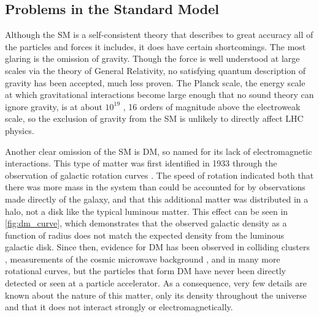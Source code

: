 \subsection{Problems in the Standard Model}
\label{sec:sm_problems}

Although the \ac{SM} is a self-consistent theory that describes to great accuracy all of the particles and forces it includes, it does have certain shortcomings. The most glaring is the omission of gravity. Though the force is well understood at large scales via the theory of General Relativity, no satisfying quantum description of gravity has been accepted, much less proven. The Planck scale, the energy scale at which gravitational interactions become large enough that no sound theory can ignore gravity, is at about $10^{19}$ \GeV, 16 orders of magnitude above the electroweak scale, so the exclusion of gravity from the \ac{SM} is unlikely to directly affect \ac{LHC} physics. 

Another clear omission of the \ac{SM} is \acf{DM}, so named for its lack of electromagnetic interactions. This type of matter was first identified in 1933 through the observation of galactic rotation curves \cite{zwicky}. The speed of rotation indicated both that there was more mass in the system than could be accounted for by observations made directly of the galaxy, and that this additional matter was distributed in a halo, not a disk like the typical luminous matter. This effect can be seen in \autoref{fig:dm_curve}, which demonstrates that the observed galactic density as a function of radius does not match the expected density from the luminous galactic disk. Since then, evidence for \ac{DM} has been observed in colliding clusters \cite{astro-ph/0608407}, measurements of the cosmic microwave background \cite{0803.0732}, and in many more rotational curves, but the particles that form \ac{DM} have never been directly detected or seen at a particle accelerator. As a consequence, very few details are known about the nature of this matter, only its density throughout the universe and that it does not interact strongly or electromagnetically. 

